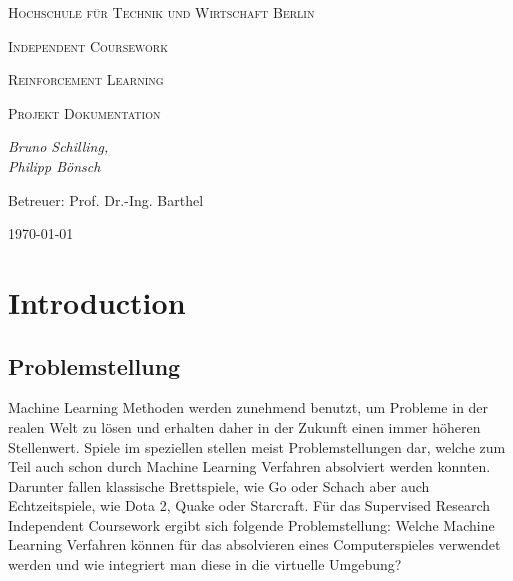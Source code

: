 \documentclass[11pt]{scrartcl}
\begin{document}

\begin{titlepage}
	\centering
	{\scshape\LARGE Hochschule für Technik und Wirtschaft Berlin \par}
	\vspace{2cm}
	{\Huge \scshape{Independent Coursework}\par}
	\vspace{2cm}
	{\LARGE \scshape{Reinforcement Learning}\par}
	{\scshape\Large Projekt Dokumentation\par}
	\vspace{4cm}
	{\large\itshape Bruno Schilling,\\Philipp Bönsch\par}
	\vfill
	
	{\large Betreuer: Prof. Dr.-Ing. Barthel \par}
	\vspace{1cm}
	{\large \today\par}
\end{titlepage}

\lstset{basicstyle=\ttfamily\small,breaklines=true}
\newpage
\tableofcontents
\newpage
\section{Introduction}

\subsection{Problemstellung}
Machine Learning Methoden werden zunehmend benutzt, um Probleme in der realen Welt zu
lösen und erhalten daher in der Zukunft einen immer höheren Stellenwert. Spiele im
speziellen stellen meist Problemstellungen dar, welche zum Teil auch schon durch Machine
Learning Verfahren absolviert werden konnten. Darunter fallen klassische Brettspiele, wie Go
oder Schach\cite{DM2018} aber auch Echtzeitspiele, wie Dota 2\cite{OA2019},
Quake\cite{DM2019} oder Starcraft\cite{DM2019_2}. Für das Supervised Research Independent Coursework
ergibt sich folgende Problemstellung: Welche Machine Learning Verfahren können für das
absolvieren eines Computerspieles verwendet werden und wie integriert man diese in die
virtuelle Umgebung?
\end{document}
